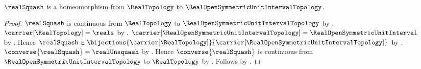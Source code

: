 \begin{theorem}\label{real_homeomorphic_to_open_symmetric_unit_interval}
    $\realSquash$ is a homeomorphism from $\RealTopology$ to
        $\RealOpenSymmetricUnitIntervalTopology$.
\end{theorem}
\begin{proof}
    $\realSquash$ is continuous from $\RealTopology$ to
        $\RealOpenSymmetricUnitIntervalTopology$
        by .
    $\carrier[\RealTopology]=\reals$
        by .
    $\carrier[\RealOpenSymmetricUnitIntervalTopology]
        =\RealOpenSymmetricUnitInterval$
        by
        .
    Hence
        $\realSquash\in\bijections{\carrier[\RealTopology]}
            {\carrier[\RealOpenSymmetricUnitIntervalTopology]}$
        by .
    $\converse{\realSquash}=\realUnsquash$
        by .
    Hence $\converse{\realSquash}$ is continuous from
        $\RealOpenSymmetricUnitIntervalTopology$ to $\RealTopology$
        by .
    Follows by .
\end{proof}
